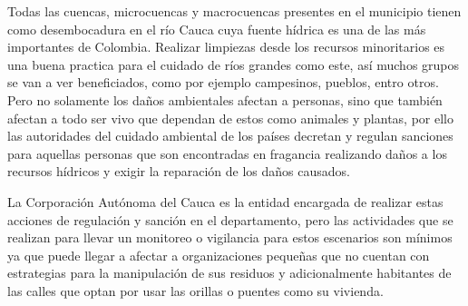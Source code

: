 Todas las cuencas, microcuencas y macrocuencas presentes en el municipio tienen como desembocadura en el río Cauca cuya fuente hídrica es una de las más importantes de Colombia. Realizar limpiezas desde los recursos minoritarios es una buena practica para el cuidado de ríos grandes como este, así muchos grupos se van a ver beneficiados, como por ejemplo campesinos, pueblos, entro otros. Pero no solamente los daños ambientales afectan a personas, sino que también afectan a todo ser vivo que dependan de estos como animales y plantas, por ello las autoridades del cuidado ambiental de los países decretan y regulan sanciones para aquellas personas que son encontradas en fragancia realizando daños a los recursos hídricos y exigir la reparación de los daños causados.

La Corporación Autónoma del Cauca es la entidad encargada de realizar estas acciones de regulación y sanción en el departamento, pero las actividades que se realizan para llevar un monitoreo o vigilancia para estos escenarios son mínimos ya que puede llegar a afectar a organizaciones pequeñas que no cuentan con estrategias para la manipulación de sus residuos y adicionalmente habitantes de las calles que optan por usar las orillas o puentes como su vivienda.
